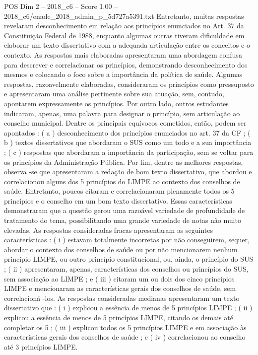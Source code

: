 \begin{textsample}{POS Dim 2 – 2018\_c6 – Score 1.00 – 2018\_c6/enade\_2018\_admin\_p\_5d727a5391.txt}
Entretanto, muitas respostas revelaram desconhecimento em relação aos princípios enunciados no Art. 37 da Constituição Federal de 1988, enquanto algumas outras tiveram dificuldade em elaborar um texto dissertativo com a adequada articulação entre os conceitos e o contexto.
As respostas mais elaboradas apresentaram uma abordagem confusa para descrever e correlacionar os princípios, demonstrando desconhecimento dos mesmos e colocando o foco sobre a importância da política de saúde.
Algumas respostas, razoavelmente elaboradas, consideraram os princípios como pressuposto e apresentaram uma análise pertinente sobre sua atuação, sem, contudo, apontarem expressamente os princípios.
Por outro lado, outros estudantes indicaram, apenas, uma palavra para designar o princípio, sem articulação ao conselho municipal.
Dentre os principais equívocos cometidos, então, podem ser apontados : ( a ) desconhecimento dos princípios enunciados no art. 37 da CF ; ( b ) textos dissertativos que abordaram o SUS como um todo e a sua importância ; ( c ) respostas que abordaram a importância da participação, sem se voltar para os princípios da Administração Pública.
Por fim, dentre as melhores respostas, observa -se que apresentaram a redação de bom texto dissertativo, que abordou e correlacionou alguns dos 5 princípios do LIMPE ao contexto dos conselhos de saúde.
Entretanto, poucos citaram e correlacionaram plenamente todos os 5 princípios e o conselho em um bom texto dissertativo.
Essas características demonstraram que a questão gerou uma razoável variedade de profundidade de tratamento do tema, possibilitando uma grande variedade de notas não muito elevadas.
As respostas consideradas fracas apresentaram as seguintes características : ( i ) estavam totalmente incorretas por não conseguirem, sequer, abordar o contexto dos conselhos de saúde ou por não mencionarem nenhum princípio LIMPE, ou outro princípio constitucional, ou, ainda, o princípio do SUS ; ( ii ) apresentaram, apenas, características dos conselhos ou princípios do SUS, sem associação ao LIMPE ; e ( iii ) citaram um ou dois dos cinco princípios LIMPE e mencionaram as características gerais dos conselhos de saúde, sem correlacioná -los.
As respostas consideradas medianas apresentaram um texto dissertativo que : ( i ) explicou a essência de menos de 5 princípios LIMPE ; ( ii ) explicou a essência de menos de 5 princípios LIMPE, citando os demais até completar os 5 ; ( iii ) explicou todos os 5 princípios LIMPE e em associação às características gerais dos conselhos de saúde ; e ( iv ) correlacionou ao conselho até 3 princípios LIMPE.

\end{textsample}
